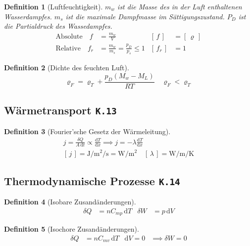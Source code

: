 \documentclass[a4paper, twocolumn]{article}
\numberwithin{equation}{section}
\theoremstyle{hsr-def}
\newtheorem{definition}{Definition}[section]
\theoremstyle{hsr-sub}
\newcommand{\dd}[1]{\ensuremath{\mathrm{d}#1}}
\newcommand{\di}[1]{\,\dd{#1}}
\newcommand{\deriv}[2]{\ensuremath{\frac{\dd{#1}}{\dd{#2}}}}
\newcommand{\unitof}[1]{\ensuremath{\left[\,#1\,\right]}}
\newcommand{\fromlecture}[1]{\textcolor{red!70!black}{\small\texttt{K.#1}}}
\begin{document}
\begin{definition}[Luftfeuchtigkeit]
\(m_w\) ist die Masse des \emph{in der Luft enthaltenen} Wasserdampfes.
\(m_s\) ist die maximale Dampfmasse im S\"attigungszustand.
\(P_D\) ist die Partialdruck des Wassedampfes.
\begin{align*}
    \text{Absolute} \quad f   &= \frac{m_w}{V}                              & \unitof{f}   & = \unitof{\varrho} \\
    \text{Relative} \quad f_r &= \frac{m_w}{m_s} = \frac{p_D}{p_s} \leq 1 & \unitof{f_r} & = 1
\end{align*}
\end{definition}

\begin{definition}[Dichte des feuchten Luft]
\[
    \varrho_F = \varrho_T + \frac{p_D(M_w - M_L)}{RT}
        \quad \varrho_F < \varrho_T
\]
\end{definition}

\subsection{W\"armetransport \fromlecture{13}}

\begin{definition}[Fourier'sche Gesetz der W\"armeleitung]
\begin{gather*}
    j = \frac{\delta Q}{A\di{t}} \propto \deriv{T}{x}
    \implies
    j = -\lambda \deriv{T}{x}
    \\
    \unitof{j} = \si{\joule\per\square\metre\per\second} = \si{\watt\per\square\metre}
    \quad
    \unitof{\lambda} = \si{\watt\per\metre\per\kelvin}
\end{gather*}
\end{definition}


\subsection{Thermodynamische Prozesse \fromlecture{14}}

\begin{definition}[Isobare Zusand\"anderungen]
\begin{align*}
    \delta Q &= nC_{mp} \di{T} & \delta W &= p \di{V}
\end{align*}
\end{definition}

\begin{definition}[Isochore Zusand\"anderungen]
\begin{align*}
    \delta Q &= nC_{mv} \di{T} & \dd{V} = 0 &\implies \delta W = 0
\end{align*}
\end{definition}
\end{document}
